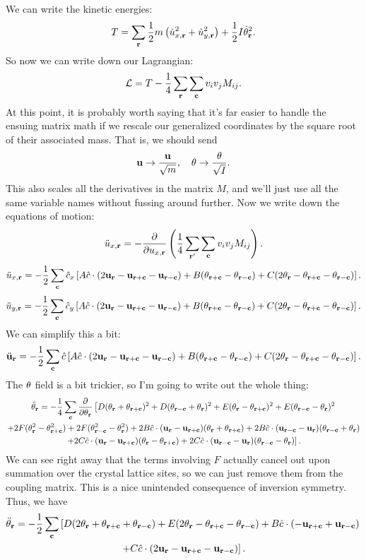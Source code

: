 \documentclass[12pt]{article}
\begin{document}
We can write the kinetic energies:
\[ T = \sum_{\mathbf{r}} \frac{1}{2}m\left(\dot u_{x,\mathbf{r}}^2 + \dot u_{y,\mathbf{r}}^2\right) + \frac{1}{2} I \dot {\theta}_{\mathbf{r}}^2.\]
So now we can write down our Lagrangian:
\[ \mathcal{L} = T - \frac{1}{4} \sum_{\mathbf{r}} \sum_{\mathbf{c}} v_i v_j M_{ij}.\]
At this point, it is probably worth saying that it's far easier to handle the ensuing matrix math if we rescale our generalized coordinates by the square root of their associated mass. That is, we should send
\[ \mathbf{u} \rightarrow \frac{\mathbf{u}}{\sqrt m},\quad \theta \rightarrow \frac{\theta}{\sqrt I}.\]
This also scales all the derivatives in the matrix $M$, and we'll just use all the same variable names without fussing around further. Now we write down the equations of motion:
\[  \ddot u_{x,\mathbf{r}} = -\frac{\partial {}}{\partial {u_{x,\ensuremath{\mathbf{r}}}}} \left(\frac{1}{4}\sum_{\mathbf{r}'}\sum_{\mathbf{c}} v_i v_j M_{ij}\right).\]
\[ \ddot u_{x,\mathbf{r}} = -\frac{1}{2} \sum_{\mathbf{c}} \hat c_x  \left [   A\hat c \cdot  (2\mathbf{u}_{\mathbf{r}} - \mathbf{u}_{\mathbf{r} + \mathbf{c}} - \mathbf{u}_{\mathbf{r} - \mathbf{c}})  + B( \theta_{\mathbf{r} + \mathbf{c}} - \theta_{\mathbf{r} - \mathbf{c}}) + C(2\theta_{\mathbf{r}} - \theta_{\mathbf{r} +\mathbf{c}} - \theta_{\mathbf{r} - \mathbf{c}})   \right]. \]
\[ \ddot u_{y,\mathbf{r}} = -\frac{1}{2} \sum_{\mathbf{c}} \hat c_y  \left [   A\hat c \cdot  (2\mathbf{u}_{\mathbf{r}} - \mathbf{u}_{\mathbf{r} + \mathbf{c}} - \mathbf{u}_{\mathbf{r} - \mathbf{c}})  + B(\theta_{\mathbf{r} + \mathbf{c}} -\theta_{\mathbf{r} - \mathbf{c}}) + C(2\theta_{\mathbf{r}} - \theta_{\mathbf{r} +\mathbf{c}} - \theta_{\mathbf{r} - \mathbf{c}})   \right]. \]
We can simplify this a bit:
\[ \ddot {\mathbf{u}}_{\mathbf{r}} = -\frac{1}{2} \sum_{\mathbf{c}} \hat c  \left [   A\hat c \cdot  (2\mathbf{u}_{\mathbf{r}} - \mathbf{u}_{\mathbf{r} + \mathbf{c}} - \mathbf{u}_{\mathbf{r} - \mathbf{c}})  + B(\theta_{\mathbf{r} + \mathbf{c}} - \theta_{\mathbf{r} - \mathbf{c}}) + C(2\theta_{\mathbf{r}} - \theta_{\mathbf{r} +\mathbf{c}} - \theta_{\mathbf{r} - \mathbf{c}})   \right]. \]
The $\theta$ field is a bit trickier, so I'm going to write out the whole thing:
\begin{multline*}
 \ddot {\theta}_{\mathbf{r}} = -\frac{1}{4} \sum_{\mathbf{c}} \frac{\partial {}}{\partial {\theta_{\ensuremath{\mathbf{r}}}}} \left [ D(\theta_{\mathbf{r}} + \theta_{\mathbf{r} + \mathbf{c}})^2 + D(\theta_{\mathbf{r} - \mathbf{c}}+\theta_{\mathbf{r}})^2 + E(\theta_{\mathbf{r}} - \theta_{\mathbf{r} + \mathbf{c}})^2 + E(\theta_{\mathbf{r} - \mathbf{c}} - \theta_{\mathbf{r}})^2 \right .\\ \left.+ 2F(\theta_{\mathbf{r}}^2 - \theta_{\mathbf{r} + \mathbf{c}}^2) + 2F(\theta_{\mathbf{r}-\mathbf{c}}^2 - \theta_{\mathbf{r}}^2) + 2B \hat c \cdot (\mathbf{u}_{\mathbf{r}} - \mathbf{u}_{\mathbf{r} + \mathbf{c}}) (\theta_{\mathbf{r}} + \theta_{\mathbf{r} + \mathbf{c}}) + 2B \hat c \cdot (\mathbf{u}_{\mathbf{r} - \mathbf{c}} - \mathbf{u}_{\mathbf{r}}) (\theta_{\mathbf{r} - \mathbf{c}} + \theta_{\mathbf{r}})  \right. \\ \left.+ 2C \hat c \cdot (\mathbf{u} _{\mathbf{r}} - \mathbf{u}_{\mathbf{r} + \mathbf{c}})(\theta_{\mathbf{r}} - \theta_{\mathbf{r} + \mathbf{c}}) + 2C \hat c \cdot (\mathbf{u}_{\mathbf{r} - \mathbf{c}} - \mathbf{u}_{\mathbf{r}})(\theta_{\mathbf{r} - \mathbf{c}} - \theta_{\mathbf{r}})\right ] .
 \end{multline*}
 We can see right away that the terms involving $F$ actually cancel out upon summation over the crystal lattice sites, so we can just remove them from the coupling matrix. This is a nice unintended consequence of inversion symmetry. Thus, we have
\begin{multline*}   \ddot {\theta}_{\mathbf{r}} = -\frac{1}{2} \sum_{\mathbf{c}} \left [ D(2\theta_{\mathbf{r}} + \theta_{\mathbf{r} + \mathbf{c}} + \theta_{\mathbf{r} - \mathbf{c}}) + E(2\theta_{\mathbf{r}} - \theta_{\mathbf{r} + \mathbf{c}} - \theta_{\mathbf{r} - \mathbf{c}}) + B \hat c \cdot (- \mathbf{u}_{\mathbf{r} + \mathbf{c}} + \mathbf{u}_{\mathbf{r} - \mathbf{c}})  \right. \\ \left.+ C\hat c \cdot (2\mathbf{u}_{\mathbf{r}} - \mathbf{u}_{\mathbf{r} + \mathbf{c}} - \mathbf{u}_{\mathbf{r} - \mathbf{c}}) \right ]. \end{multline*}
\end{document}
